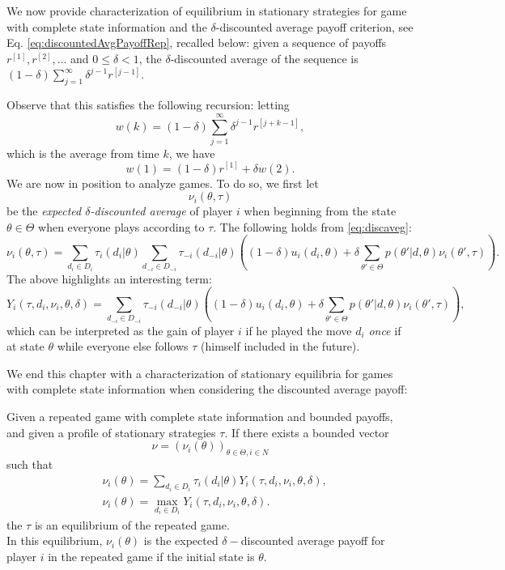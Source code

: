 We now provide characterization of equilibrium in stationary strategies for game with complete state information and the
$\delta$-discounted average payoff criterion, see Eq.  \eqref{eq:discountedAvgPayoffRep}, recalled below:
given a sequence of payoffs $r^{[1]}, r^{[2]}, \ldots$ and $0 \leq \delta < 1$, the $\delta$-discounted average of the sequence is
$(1-\delta) \sum_{j = 1}^{\infty} \delta^{j-1}r^{[j-1]}$.

Observe that this satisfies the following recursion: letting
$$w(k) = (1-\delta) \sum_{j = 1}^{\infty} \delta^{j-1}r^{[j+k-1]},  $$
which is the average from time $k$, we have
\begin{equation}
 w(1)  =  (1-\delta)r^{[1]} + \delta w(2).
\label{eq:discaveg}
\end{equation}
We are now in position to analyze games. To do so, we first let
$$ \nu_i(\theta, \tau) $$
be the \emph{expected $\delta$-discounted average} of player $i$ when beginning from the state $\theta \in \Theta$ when everyone plays according to $\tau$.
The following holds from \eqref{eq:discaveg}:
\begin{equation}
\nu_i(\theta, \tau) = \sum_{d_i \in D_i} \tau_i(d_i | \theta) \sum_{d_{-i} \in D_{-i}} \tau_{-i}(d_{-i} | \theta) \left ( (1-\delta) u_i(d_i, \theta) + \delta \sum_{\theta' \in \Theta}  p(\theta' |d, \theta) \nu_i(\theta', \tau) \right ).
\label{theNuequation}
\end{equation}
The above highlights an interesting term:
$$Y_i(\tau, d_i, \nu_i, \theta, \delta) =  \sum_{d_{-i} \in D_{-i}} \tau_{-i}(d_{-i} | \theta) \left ( (1-\delta) u_i(d_i, \theta) + \delta \sum_{\theta' \in \Theta}  p(\theta' |d, \theta) \nu_i(\theta', \tau) \right ), $$
which can be interpreted as the gain of player $i$ if he played the move $d_i$ \emph{once} if at state $\theta$ while everyone else follows $\tau$ (himself included in the future).

We end this chapter with a characterization of stationary equilibria for games with complete state information when considering the discounted average payoff:
\begin{theorem}
\label{thm:stateq}
Given a repeated game with complete state information and bounded payoffs, and given a profile of stationary strategies $\tau$. If there exists a bounded vector
$$ \nu = (\nu_i(\theta))_{\theta \in \Theta, i \in N} $$
such that
\begin{align}
& \nu_i(\theta) = \sum_{d_i \in D_i} \tau_i(d_i | \theta) Y_i(\tau, d_i, \nu_i, \theta, \delta), \label{thmStufmathc1}\\
& \nu_i(\theta) = \max_{d_i \in D_i} Y_i(\tau, d_i, \nu_i, \theta, \delta) .\label{thmStufmathc2}
\end{align}
the $\tau$ is an equilibrium of the repeated game. \\
In this equilibrium, $\nu_i(\theta)$ is the expected $\delta-$discounted average payoff for player $i$ in the repeated game if the initial state is $\theta$.
\end{theorem}


